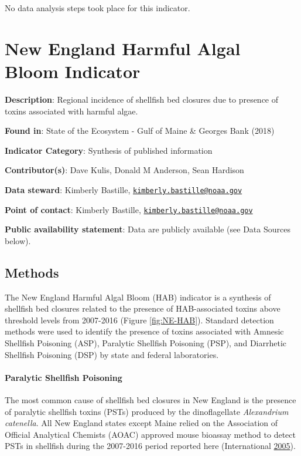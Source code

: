 \documentclass[
]{book}
\begin{document}
No data analysis steps took place for this indicator.

\hypertarget{new-england-harmful-algal-bloom-indicator}{%
\chapter{New England Harmful Algal Bloom Indicator}\label{new-england-harmful-algal-bloom-indicator}}

\textbf{Description}: Regional incidence of shellfish bed closures due to presence of toxins associated with harmful algae.

\textbf{Found in}: State of the Ecosystem - Gulf of Maine \& Georges Bank (2018)

\textbf{Indicator Category}: Synthesis of published information

\textbf{Contributor(s)}: Dave Kulis, Donald M Anderson, Sean Hardison

\textbf{Data steward}: Kimberly Bastille, \href{mailto:kimberly.bastille@noaa.gov}{\nolinkurl{kimberly.bastille@noaa.gov}}

\textbf{Point of contact}: Kimberly Bastille, \href{mailto:kimberly.bastille@noaa.gov}{\nolinkurl{kimberly.bastille@noaa.gov}}

\textbf{Public availability statement}: Data are publicly available (see Data Sources below).

\hypertarget{methods-24}{%
\section{Methods}\label{methods-24}}

The New England Harmful Algal Bloom (HAB) indicator is a synthesis of shellfish bed closures related to the presence of HAB-associated toxins above threshold levels from 2007-2016 (Figure \ref{fig:NE-HAB}). Standard detection methods were used to identify the presence of toxins associated with Amnesic Shellfish Poisoning (ASP), Paralytic Shellfish Poisoning (PSP), and Diarrhetic Shellfish Poisoning (DSP) by state and federal laboratories.

\hypertarget{paralytic-shellfish-poisoning}{%
\subsubsection{Paralytic Shellfish Poisoning}\label{paralytic-shellfish-poisoning}}

The most common cause of shellfish bed closures in New England is the presence of paralytic shellfish toxins (PSTs) produced by the dinoflagellate \emph{Alexandrium catenella}. All New England states except Maine relied on the Association of Official Analytical Chemists (AOAC) approved mouse bioassay method to detect PSTs in shellfish during the 2007-2016 period reported here (International \protect\hyperlink{ref-Anonymous2005}{2005}).
\end{document}
